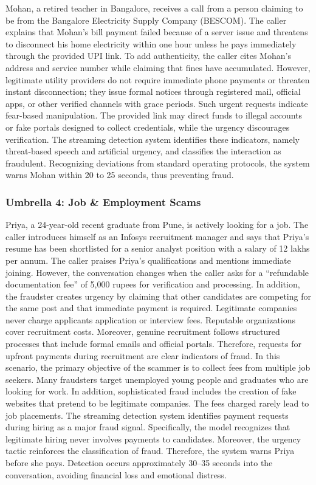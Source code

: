 \documentclass{article}
\begin{document}
Mohan, a retired teacher in Bangalore, receives a call from a person claiming to be from the Bangalore Electricity Supply Company (BESCOM). The caller explains that Mohan's bill payment failed because of a server issue and threatens to disconnect his home electricity within one hour unless he pays immediately through the provided UPI link. To add authenticity, the caller cites Mohan's address and service number while claiming that fines have accumulated. However, legitimate utility providers do not require immediate phone payments or threaten instant disconnection; they issue formal notices through registered mail, official apps, or other verified channels with grace periods. Such urgent requests indicate fear-based manipulation. The provided link may direct funds to illegal accounts or fake portals designed to collect credentials, while the urgency discourages verification. The streaming detection system identifies these indicators, namely threat-based speech and artificial urgency, and classifies the interaction as fraudulent. Recognizing deviations from standard operating protocols, the system warns Mohan within 20 to 25 seconds, thus preventing fraud.

\subsubsection{Umbrella 4: Job \& Employment Scams}
\label{app:casestudy:job}

Priya, a 24-year-old recent graduate from Pune, is actively looking for a job. The caller introduces himself as an Infosys recruitment manager and says that Priya's resume has been shortlisted for a senior analyst position with a salary of 12 lakhs per annum. The caller praises Priya's qualifications and mentions immediate joining. However, the conversation changes when the caller asks for a ``refundable documentation fee'' of 5,000 rupees for verification and processing. In addition, the fraudster creates urgency by claiming that other candidates are competing for the same post and that immediate payment is required. Legitimate companies never charge applicants application or interview fees. Reputable organizations cover recruitment costs. Moreover, genuine recruitment follows structured processes that include formal emails and official portals. Therefore, requests for upfront payments during recruitment are clear indicators of fraud. In this scenario, the primary objective of the scammer is to collect fees from multiple job seekers. Many fraudsters target unemployed young people and graduates who are looking for work. In addition, sophisticated fraud includes the creation of fake websites that pretend to be legitimate companies. The fees charged rarely lead to job placements. The streaming detection system identifies payment requests during hiring as a major fraud signal. Specifically, the model recognizes that legitimate hiring never involves payments to candidates. Moreover, the urgency tactic reinforces the classification of fraud. Therefore, the system warns Priya before she pays. Detection occurs approximately 30--35 seconds into the conversation, avoiding financial loss and emotional distress.
\end{document}
